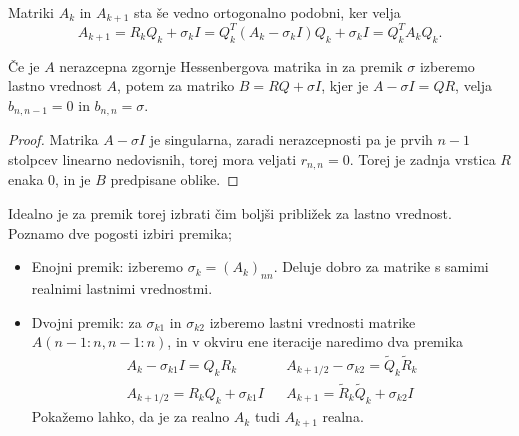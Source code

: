 Matriki $A_k$ in $A_{k+1}$ sta še vedno ortogonalno podobni, ker velja
\[
  A_{k+1} = R_k Q_k + \sigma_k I = Q_k^T(A_k - \sigma_k I) Q_k + \sigma_k I =
  Q_k^T A_k Q_k.
\]

\begin{lema}
  Če je $A$ nerazcepna zgornje Hessenbergova matrika in za premik $\sigma$
  izberemo lastno vrednost $A$, potem za matriko $B = RQ + \sigma I$, kjer je $A
  - \sigma I = QR$, velja $b_{n,n-1} = 0$ in $b_{n,n} = \sigma$.
\end{lema}

\begin{proof}
  Matrika $A - \sigma I$ je singularna, zaradi nerazcepnosti pa je prvih $n-1$
  stolpcev linearno nedovisnih, torej mora veljati $r_{n,n} = 0$.
  Torej je zadnja vrstica $R$ enaka $0$, in je $B$ predpisane oblike.
\end{proof}


Idealno je za premik torej izbrati čim boljši približek za lastno vrednost.
Poznamo dve pogosti izbiri premika;
\begin{itemize}
\item Enojni premik: izberemo $\sigma_k = (A_k)_{nn}$.
  Deluje dobro za matrike s samimi realnimi lastnimi vrednostmi.
\item Dvojni premik: za $\sigma_{k1}$ in $\sigma_{k2}$ izberemo lastni vrednosti
  matrike $A(n-1:n,n-1:n)$, in v okviru ene iteracije naredimo dva premika
  \begin{align*}
	A_k - \sigma_{k1} I = Q_k R_k && A_{k+1/2} - \sigma_{k2} = \tilde{Q}_k \tilde{R}_k \\
	A_{k+1/2} = R_k Q_k + \sigma_{k1} I && A_{k+1} = \tilde{R}_k \tilde{Q}_k + \sigma_{k2} I
  \end{align*}
  Pokažemo lahko, da je za realno $A_k$ tudi $A_{k+1}$ realna.
\end{itemize}


